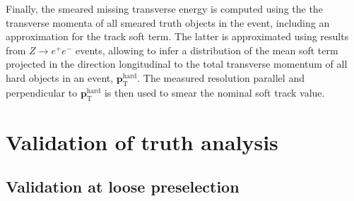 Finally, the smeared missing transverse energy is computed using the the transverse momenta of all smeared truth objects in the event, including an approximation for the track soft term. The latter is approximated using results from $Z\rightarrow e^+e^-$ events, allowing to infer a distribution of the mean soft term projected in the direction longitudinal to the total transverse momentum of all hard objects in an event, $\boldsymbol{p}_\mathrm{T}^\mathrm{hard}$. The measured resolution parallel and perpendicular to $\boldsymbol{p}_\mathrm{T}^\mathrm{hard}$ is then used to smear the nominal soft track value.
 
 
 \section{Validation of truth analysis}
 
 \subsection{Validation at loose preselection}


